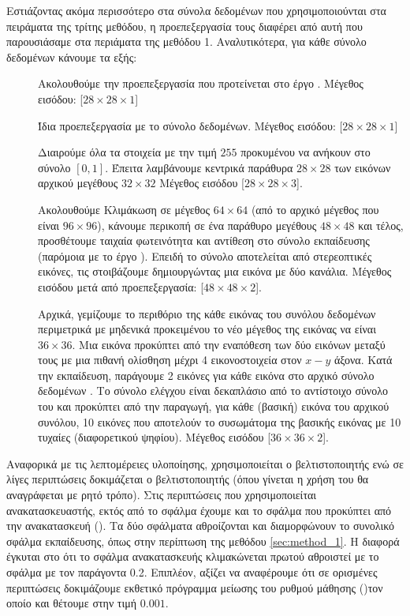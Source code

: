 Εστιάζοντας ακόμα περισσότερο στα σύνολα δεδομένων που χρησιμοποιούνται στα πειράματα της τρίτης μεθόδου, η προεπεξεργασία τους διαφέρει από αυτή που παρουσιάσαμε στα περιάματα της μεθόδου 1. Αναλυτικότερα, για κάθε σύνολο δεδομένων κάνουμε τα εξής:
\begin{description}
    \item[] Ακολουθούμε την προεπεξεργασία που προτείνεται στο έργο \cite{byerly2020branching}. Μέγεθος εισόδου: [$28 \times 28 \times 1$]
    \item[] Ίδια προεπεξεργασία με το σύνολο δεδομένων. Μέγεθος εισόδου: [$28 \times 28 \times 1$]
    \item[] Διαιρούμε όλα τα στοιχεία με την τιμή $255$ προκυμένου να ανήκουν στο σύνολο $[0,1]$. Έπειτα λαμβάνουμε κεντρικά παράθυρα $28 \times 28$ των εικόνων αρχικού μεγέθους $32 \times 32$ Μέγεθος εισόδου [$28 \times 28 \times 3$].
    \item[] Ακολουθούμε Κλιμάκωση σε μέγεθος $64 \times 64$ (από το αρχικό μέγεθος που είναι $96 \times 96$), κάνουμε περικοπή σε ένα παράθυρο μεγέθους $48 \times 48$ και τέλος, προσθέτουμε ταιχαία φωτεινότητα και αντίθεση στο σύνολο εκπαίδευσης (παρόμοια με το έργο \cite{hinton2018matrix}). Επειδή το σύνολο αποτελείται από στερεοπτικές εικόνες, τις στοιβάζουμε δημιουργώντας μια εικόνα με δύο κανάλια. Μέγεθος εισόδου μετά από προεπεξεργασία: [$48 \times 48 \times 2$].
    \item[] Αρχικά, γεμίζουμε το περιθόριο της κάθε εικόνας του συνόλου δεδομένων  περιμετρικά με μηδενικά προκειμένου το νέο μέγεθος της εικόνας να είναι $36 \times 36$. Μια εικόνα  προκύπτει από την εναπόθεση των δύο εικόνων μεταξύ τους με μια πιθανή ολίσθηση μέχρι 4 εικονοστοιχεία στον $x-y$ άξονα. Κατά την εκπαίδευση, παράγουμε 2  εικόνες για κάθε εικόνα στο αρχικό σύνολο δεδομένων . Το σύνολο ελέγχου είναι δεκαπλάσιο από το αντίστοιχο σύνολο του  και προκύπτει από την παραγωγή, για κάθε (βασική) εικόνα του αρχικού συνόλου, 10 εικόνες που αποτελούν το συσωμάτομα της βασικής εικόνας με 10 τυχαίες (διαφορετικού ψηφίου). Μέγεθος εισόδου [$36 \times 36 \times 2$].
\end{description} 

Αναφορικά με τις λεπτομέρειες υλοποίησης, χρησιμοποιείται ο βελτιστοποιητής  ενώ σε λίγες περιπτώσεις δοκιμάζεται ο βελτιστοποιητής  (όπου γίνεται η χρήση του θα αναγράφεται με ρητό τρόπο). Στις περιπτώσεις που χρησιμοποιείται ανακατασκευαστής, εκτός από το σφάλμα  έχουμε και το σφάλμα που προκύπτει από την ανακατασκευή (). Τα δύο σφάλματα αθροίζονται και διαμορφώνουν το συνολικό σφάλμα εκπαίδευσης, όπως στην περίπτωση της μεθόδου \ref{sec:method_1}. Η διαφορά έγκυται στο ότι το σφάλμα ανακατασκευής κλιμακώνεται πρωτού αθροιστεί με το σφάλμα  με τον παράγοντα 0.2. Επιπλέον, αξίζει να αναφέρουμε ότι σε ορισμένες περιπτώσεις δοκιμάζουμε εκθετικό πρόγραμμα μείωσης του ρυθμού μάθησης ()τον οποίο και θέτουμε στην τιμή $0.001$.\par

